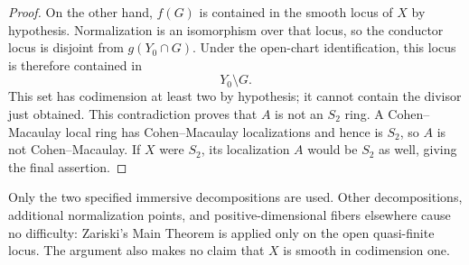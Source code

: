 \begin{proof}
On the other hand, $f(G)$ is contained in the smooth locus of $X$
by hypothesis. Normalization is an isomorphism over that locus, so the conductor locus is disjoint from
$g(Y_0\cap G)$. Under the open-chart identification,
this locus is therefore contained in
\[
 Y_0\setminus G.
\]
This set has codimension at least two by hypothesis;
it cannot contain the divisor just obtained. This contradiction
proves that $A$ is not an $S_2$ ring. A Cohen--Macaulay local ring
has Cohen--Macaulay localizations
\cite[Tag~00NB]{stacks-project} and hence is $S_2$, so $A$ is not
Cohen--Macaulay. If $X$ were $S_2$, its localization $A$ would
be $S_2$ as well, giving the final assertion.
\end{proof}

\begin{remark}\label{rem:fiber-scope}
Only the two specified immersive decompositions are used. Other
decompositions, additional normalization points, and positive-dimensional
fibers elsewhere cause no difficulty: Zariski's Main Theorem is applied
only on the open quasi-finite locus. The argument also makes no claim
that $X$ is smooth in codimension one.
\end{remark}
